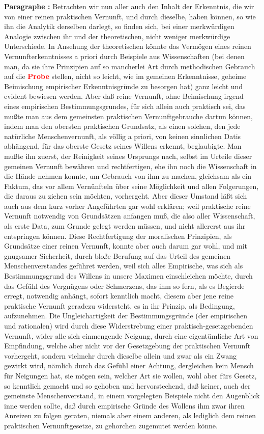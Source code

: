 \documentclass[a4paper,12pt,twoside]{book}
\newcommand{\match}[1]{\textcolor{red}{\textbf{#1}}}
\begin{document}
	\noindent\textbf{Paragraphe : }Betrachten wir nun aller auch den Inhalt der Erkenntnis, die wir von einer reinen praktischen Vernunft, und durch dieselbe, haben können, so wie ihn die Analytik derselben darlegt, so finden sich, bei einer merkwürdigen Analogie zwischen ihr und der theoretischen, nicht weniger merkwürdige Unterschiede. In Ansehung der theoretischen könnte das Vermögen eines reinen Vernunfterkenntnisses a priori durch Beispiele aus Wissenschaften (bei denen man, da sie ihre Prinzipien auf so mancherlei Art durch methodischen Gebrauch auf die \match{Probe} stellen, nicht so leicht, wie im gemeinen Erkenntnisse, geheime Beimischung empirischer Erkenntnisgründe zu besorgen hat) ganz leicht und evident bewiesen werden. Aber daß reine Vernunft, ohne Beimischung irgend eines empirischen Bestimmungsgrundes, für sich allein auch praktisch sei, das mußte man aus dem gemeinsten praktischen Vernunftgebrauche dartun können, indem man den obersten praktischen Grundsatz, als einen solchen, den jede natürliche Menschenvernunft, als völlig a priori, von keinen sinnlichen Datis abhängend, für das oberste Gesetz seines Willens erkennt, beglaubigte. Man mußte ihn zuerst, der Reinigkeit seines Ursprungs nach, selbst im Urteile dieser gemeinen Vernunft bewähren und rechtfertigen, ehe ihn noch die Wissenschaft in die Hände nehmen konnte, um Gebrauch von ihm zu machen, gleichsam als ein Faktum, das vor allem Vernünfteln über seine Möglichkeit und allen Folgerungen, die daraus zu ziehen sein möchten, vorhergeht. Aber dieser Umstand läßt sich auch aus dem kurz vorher Angeführten gar wohl erklären; weil praktische reine Vernunft notwendig von Grundsätzen anfangen muß, die also aller Wissenschaft, als erste Data, zum Grunde gelegt werden müssen, und nicht allererst aus ihr entspringen können. Diese Rechtfertigung der moralischen Prinzipien, als Grundsätze einer  reinen Vernunft, konnte aber auch darum gar wohl, und mit gnugsamer Sicherheit, durch bloße Berufung auf das Urteil des gemeinen Menschenverstandes geführet werden, weil sich alles Empirische, was sich als Bestimmungsgrund des Willens in unsere Maximen einschleichen möchte, durch das Gefühl des Vergnügens oder Schmerzens, das ihm so fern, als es Begierde erregt, notwendig anhängt, sofort kenntlich macht, diesem aber jene reine praktische Vernunft geradezu widersteht, es in ihr Prinzip, als Bedingung, aufzunehmen. Die Ungleichartigkeit der Bestimmungsgründe (der empirischen und rationalen) wird durch diese Widerstrebung einer praktisch-gesetzgebenden Vernunft, wider alle sich einmengende Neigung, durch eine eigentümliche Art von Empfindung, welche aber nicht vor der Gesetzgebung der praktischen Vernunft vorhergeht, sondern vielmehr durch dieselbe allein und zwar als ein Zwang gewirkt wird, nämlich durch das Gefühl einer Achtung, dergleichen kein Mensch für Neigungen hat, sie mögen sein, welcher Art sie wollen, wohl aber fürs Gesetz, so kenntlich gemacht und so gehoben und hervorstechend, daß keiner, auch der gemeinste Menschenverstand, in einem vorgelegten Beispiele nicht den Augenblick inne werden sollte, daß durch empirische Gründe des Wollens ihm zwar ihren Anreizen zu folgen geraten, niemals aber einem anderen, als lediglich dem reinen praktischen Vernunftgesetze, zu gehorchen zugemutet werden könne. 
	
\end{document}
